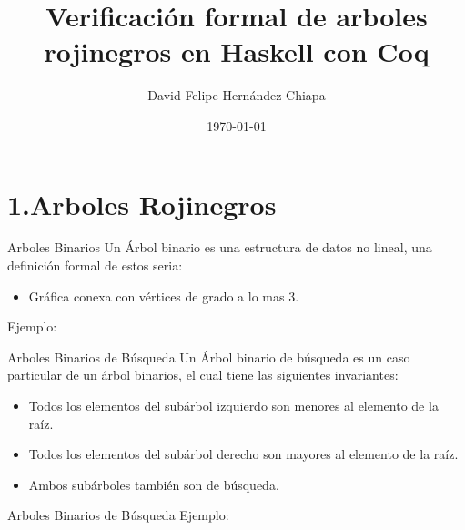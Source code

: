 \documentclass[xcolor=dvipsnames,table,handout]{beamer}
\title[]{Verificación formal de arboles rojinegros en Haskell con Coq}
\author[]{David Felipe Hernández Chiapa}
\institute[UNAM-FC]{Facultad de Ciencias\\
Universidad Nacional Aut\'onoma de M\'exico}
\date[]{\small{\today}}
\begin{document}
\frame{\titlepage}

\section{1.Arboles Rojinegros}
\begin{frame}{Arboles Binarios}
Un Árbol binario es una estructura de datos no lineal, una definición formal de estos seria:
\begin{itemize}
    \item Gráfica conexa con vértices de grado a lo mas 3.
\end{itemize}
Ejemplo:

\centering
\end{frame}

\begin{frame}{Arboles Binarios de Búsqueda}
Un Árbol binario de búsqueda es un caso particular de  un árbol binarios, el cual tiene las siguientes invariantes:
\begin{itemize}
    \item Todos los elementos del subárbol izquierdo son menores al elemento de la raíz.
    \item Todos los elementos del subárbol derecho son mayores al elemento de la raíz.
    \item Ambos subárboles también son de búsqueda.
\end{itemize}

\end{frame}


\begin{frame}{Arboles Binarios de Búsqueda}
Ejemplo:

\centering

\end{frame}
\end{document}
